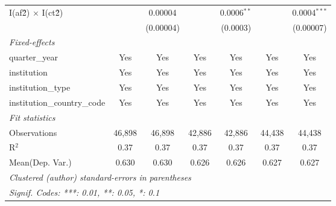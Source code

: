 \begin{tabular}{lcccccc}
   I(af\^2) $\times$ I(ct\^2)         &               & 0.00004        &               & 0.0006$^{**}$  &               & 0.0004$^{***}$\\   
                                      &               & (0.00004)      &               & (0.0003)       &               & (0.00007)\\   
   \midrule
   \emph{Fixed-effects}\\
   quarter\_year                      & Yes           & Yes            & Yes           & Yes            & Yes           & Yes\\  
   institution                        & Yes           & Yes            & Yes           & Yes            & Yes           & Yes\\  
   institution\_type                  & Yes           & Yes            & Yes           & Yes            & Yes           & Yes\\  
   institution\_country\_code         & Yes           & Yes            & Yes           & Yes            & Yes           & Yes\\  
   \midrule
   \emph{Fit statistics}\\
   Observations                       & 46,898        & 46,898         & 42,886        & 42,886         & 44,438        & 44,438\\  
   R$^2$                              & 0.37          & 0.37           & 0.37          & 0.37           & 0.37          & 0.37\\  
Mean(Dep. Var.) & 0.630 & 0.630 & 0.626 & 0.626 & 0.627 & 0.627 \\
   \midrule \midrule
   \multicolumn{7}{l}{\emph{Clustered (author) standard-errors in parentheses}}\\
   \multicolumn{7}{l}{\emph{Signif. Codes: ***: 0.01, **: 0.05, *: 0.1}}\\
\end{tabular}
\par\endgroup
